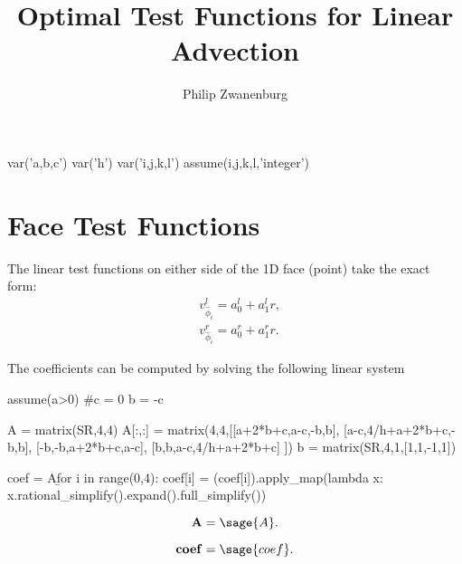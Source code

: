 \documentclass{article}
\title{Optimal Test Functions for Linear Advection}
\author{Philip Zwanenburg}
\numberwithin{equation}{section}
\newcommand{\vect}[1]{\mathbf{{#1}}}
\newcommand{\mat}[1]{\mathbf{{#1}}}
\begin{document}
\maketitle





\begin{sagesilent}
var('a,b,c')
var('h')
var('i,j,k,l')
assume(i,j,k,l,'integer')
\end{sagesilent}

\section{Face Test Functions}

The linear test functions on either side of the 1D face (point) take the exact form:
\begin{align*}
& v_{\hat{\phi}_i}^l = a_0^l + a_1^l r,\\
& v_{\hat{\phi}_i}^r = a_0^r + a_1^r r.
\end{align*}

The coefficients can be computed by solving the following linear system

\begin{sagesilent}
assume(a>0)
#c = 0
b = -c

A = matrix(SR,4,4)
A[:,:] = matrix(4,4,[[a+2*b+c,a-c,-b,b],
                     [a-c,4/h+a+2*b+c,-b,b],
                     [-b,-b,a+2*b+c,a-c],
                     [b,b,a-c,4/h+a+2*b+c]
                    ])
b = matrix(SR,4,1,[1,1,-1,1])

coef = A\b
for i in range(0,4):
    coef[i] = (coef[i]).apply_map(lambda x: x.rational_simplify().expand().full_simplify())
\end{sagesilent}


\[
\mat{A} = \sage{A}.
\]

\[
\vect{coef} = \sage{coef}.
\]



%
%
\end{document}
